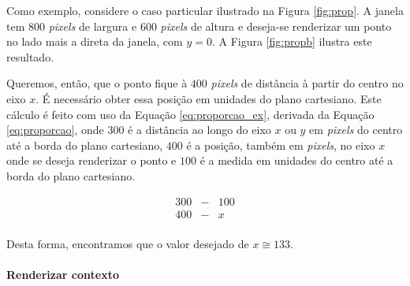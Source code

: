 Como exemplo, considere o caso particular ilustrado na Figura \ref{fig:prop}. A janela tem $800$ \emph{pixels} de largura e $600$ \emph{pixels} de altura e deseja-se renderizar um ponto no lado mais a direta da janela, com $y = 0$. A Figura \ref{fig:propb} ilustra este resultado.

%

%

Queremos, então, que o ponto fique à $400$ \emph{pixels} de distância à partir do centro no eixo $x$. É necessário obter essa posição em unidades do plano cartesiano. Este cálculo é feito com uso da Equação \ref{eq:proporcao_ex}, derivada da Equação \ref{eq:proporcao}, onde $300$ é a distância ao longo do eixo $x$ ou $y$ em \emph{pixels} do centro até a borda do plano cartesiano, $400$ é a posição, também em \emph{pixels}, no eixo $x$ onde se deseja renderizar o ponto e $100$ é a medida em unidades do centro até a borda do plano cartesiano.



\begin{equation} \label{eq:proporcao_ex}
  \begin{matrix}
    300 &  - & 100 \\
    400 & - & x \\
  \end{matrix}
\end{equation}

Desta forma, encontramos que o valor desejado de $x \cong 133$.

 \paragraph{Renderizar contexto}\mbox{}\\

